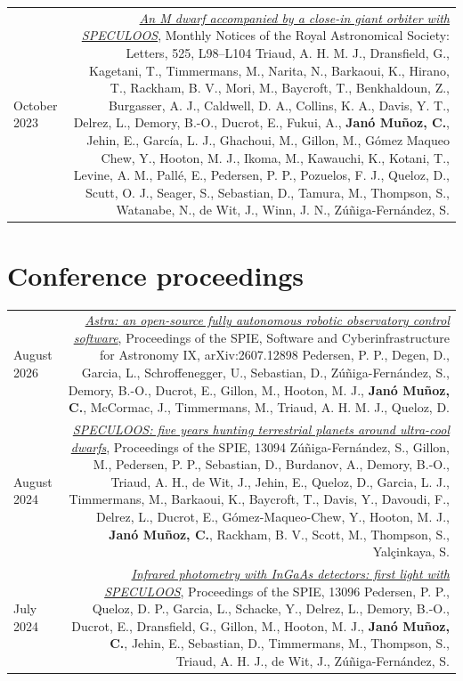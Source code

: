 \documentclass{article}
\newcommand{\me}{\textbf{Janó Muñoz, C.}}
\newcommand{\authlist}[1]{{\footnotesize #1}}
\begin{document}
\begin{longtable}{L!{\vrule}R}
    October 2023 &
    \href{https://ui.adsabs.harvard.edu/abs/2023MNRAS.525L..98T/abstract}{\textit{An M dwarf accompanied by a close-in giant orbiter with SPECULOOS}},
    Monthly Notices of the Royal Astronomical Society: Letters, 525, L98--L104 \newline
    \authlist{Triaud, A. H. M. J., Dransfield, G., Kagetani, T., Timmermans, M., Narita, N., Barkaoui, K., Hirano, T., Rackham, B. V., Mori, M., Baycroft, T., Benkhaldoun, Z., Burgasser, A. J., Caldwell, D. A., Collins, K. A., Davis, Y. T., Delrez, L., Demory, B.-O., Ducrot, E., Fukui, A., \me, Jehin, E., García, L. J., Ghachoui, M., Gillon, M., Gómez Maqueo Chew, Y., Hooton, M. J., Ikoma, M., Kawauchi, K., Kotani, T., Levine, A. M., Pallé, E., Pedersen, P. P., Pozuelos, F. J., Queloz, D., Scutt, O. J., Seager, S., Sebastian, D., Tamura, M., Thompson, S., Watanabe, N., de Wit, J., Winn, J. N., Zúñiga-Fernández, S.} \\
\end{longtable}

\section*{Conference proceedings}
\begin{longtable}{L!{\vrule}R}
    August 2026 &
    \href{https://doi.org/10.1117/12.3105437}{\textit{Astra: an open-source fully autonomous robotic observatory control software}},
    Proceedings of the SPIE, Software and Cyberinfrastructure for Astronomy IX, arXiv:2607.12898 \newline
    \authlist{Pedersen, P. P., Degen, D., Garcia, L., Schroffenegger, U., Sebastian, D., Zúñiga-Fernández, S., Demory, B.-O., Ducrot, E., Gillon, M., Hooton, M. J., \me, McCormac, J., Timmermans, M., Triaud, A. H. M. J., Queloz, D.} \\ %

    August 2024 &
    \href{https://ui.adsabs.harvard.edu/abs/2024SPIE13094E..13Z/abstract}{\textit{SPECULOOS: five years hunting terrestrial planets around ultra-cool dwarfs}},
    Proceedings of the SPIE, 13094 \newline
    \authlist{Zúñiga-Fernández, S., Gillon, M., Pedersen, P. P., Sebastian, D., Burdanov, A., Demory, B.-O., Triaud, A. H., de Wit, J., Jehin, E., Queloz, D., Garcia, L. J., Timmermans, M., Barkaoui, K., Baycroft, T., Davis, Y., Davoudi, F., Delrez, L., Ducrot, E., Gómez-Maqueo-Chew, Y., Hooton, M. J., \me, Rackham, B. V., Scott, M., Thompson, S., Yalçinkaya, S.} \\

    July 2024 &
    \href{https://ui.adsabs.harvard.edu/abs/2024SPIE13096E..3XP/abstract}{\textit{Infrared photometry with InGaAs detectors: first light with SPECULOOS}},
    Proceedings of the SPIE, 13096 \newline
    \authlist{Pedersen, P. P., Queloz, D. P., Garcia, L., Schacke, Y., Delrez, L., Demory, B.-O., Ducrot, E., Dransfield, G., Gillon, M., Hooton, M. J., \me, Jehin, E., Sebastian, D., Timmermans, M., Thompson, S., Triaud, A. H. J., de Wit, J., Zúñiga-Fernández, S.} \\
\end{longtable}
\end{document}
